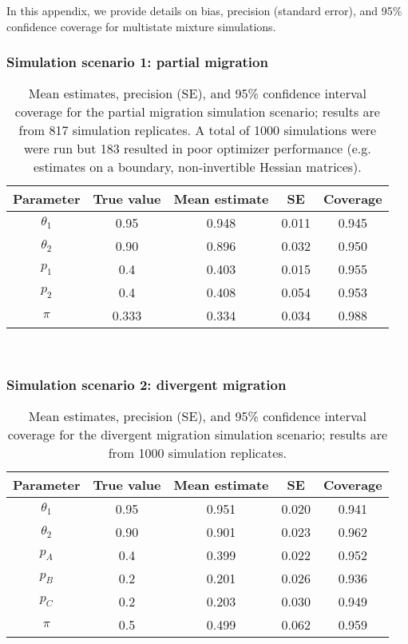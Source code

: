 \documentclass[times,mee,doublespace,]{besauth2}
\begin{document}
\begin{flushleft}

\raggedbottom

In this appendix, we provide details on bias, precision (standard error), and 95\% confidence coverage for multistate mixture simulations.

\subsubsection*{Simulation scenario 1: partial migration}

\begin{table}[ht]
\caption{Mean estimates, precision (SE), and 95\% confidence interval coverage for the partial migration simulation scenario; results are from 817 simulation replicates. A total of 1000 simulations were were run but 183 resulted in poor optimizer performance (e.g. estimates on a boundary, non-invertible Hessian matrices).
}
\label{tab:partial}
\raggedright
\begin{tabular}{ccccc}
  \hline
  Parameter & True value & Mean estimate & SE & Coverage \\
  \hline
 $\theta_1$ & 0.95 & 0.948 & 0.011 & 0.945 \\
 $\theta_2$ & 0.90 & 0.896 & 0.032 & 0.950 \\
 $p_1$ & 0.4 & 0.403 & 0.015 & 0.955 \\
 $p_2$  & 0.4 & 0.408 & 0.054 & 0.953 \\
 $\pi$  & 0.333 & 0.334 & 0.034 & 0.988 \\
 \hline
\end{tabular}
\\
\end{table}

\subsubsection*{Simulation scenario 2: divergent migration}

\begin{table}[ht]
\caption{Mean estimates, precision (SE), and 95\% confidence interval coverage for the divergent migration simulation scenario; results are from 1000 simulation replicates.
}
\label{tab:divergent}
\raggedright
\begin{tabular}{ccccc}
  \hline
  Parameter & True value & Mean estimate & SE & Coverage \\
  \hline
 $\theta_1$ & 0.95 & 0.951 & 0.020 & 0.941 \\
 $\theta_2$ & 0.90 & 0.901 & 0.023 & 0.962 \\
 $p_A$ & 0.4 & 0.399 & 0.022 & 0.952 \\
 $p_B$  & 0.2 & 0.201 & 0.026 & 0.936  \\
 $p_C$ & 0.2 & 0.203 & 0.030 & 0.949 \\
 $\pi$  & 0.5 & 0.499& 0.062 & 0.959 \\
 \hline
\end{tabular}
\\
\end{table}


\end{flushleft}
\end{document}
